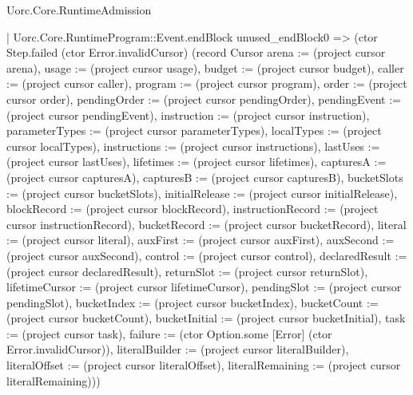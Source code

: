 \begin{lexlean}{Uorc.Core.RuntimeAdmission}
\begin{semanticmodule}
{          | Uorc.Core.RuntimeProgram::Event.endBlock unused_endBlock0 => (ctor Step.failed (ctor Error.invalidCursor) (record Cursor {arena := (project cursor arena), usage := (project cursor usage), budget := (project cursor budget), caller := (project cursor caller), program := (project cursor program), order := (project cursor order), pendingOrder := (project cursor pendingOrder), pendingEvent := (project cursor pendingEvent), instruction := (project cursor instruction), parameterTypes := (project cursor parameterTypes), localTypes := (project cursor localTypes), instructions := (project cursor instructions), lastUses := (project cursor lastUses), lifetimes := (project cursor lifetimes), capturesA := (project cursor capturesA), capturesB := (project cursor capturesB), bucketSlots := (project cursor bucketSlots), initialRelease := (project cursor initialRelease), blockRecord := (project cursor blockRecord), instructionRecord := (project cursor instructionRecord), bucketRecord := (project cursor bucketRecord), literal := (project cursor literal), auxFirst := (project cursor auxFirst), auxSecond := (project cursor auxSecond), control := (project cursor control), declaredResult := (project cursor declaredResult), returnSlot := (project cursor returnSlot), lifetimeCursor := (project cursor lifetimeCursor), pendingSlot := (project cursor pendingSlot), bucketIndex := (project cursor bucketIndex), bucketCount := (project cursor bucketCount), bucketInitial := (project cursor bucketInitial), task := (project cursor task), failure := (ctor Option.some [Error] (ctor Error.invalidCursor)), literalBuilder := (project cursor literalBuilder), literalOffset := (project cursor literalOffset), literalRemaining := (project cursor literalRemaining)}))
}
\end{semanticmodule}
\end{lexlean}
